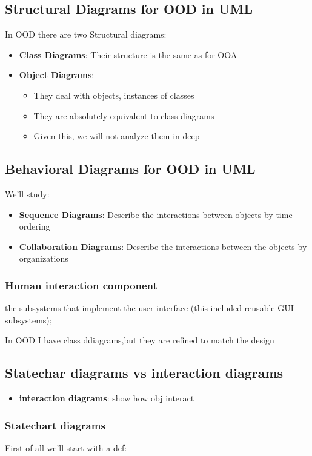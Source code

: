 \subsection{Structural Diagrams for OOD in UML}
In OOD there are two Structural diagrams:
\begin{itemize}
    \item \textbf{Class Diagrams}: Their structure is the same as for OOA
    \item \textbf{Object Diagrams}:
    \begin{itemize}
        \item They deal with objects, instances of classes
        \item  They are absolutely equivalent to class diagrams
        \item  Given this, we will not analyze them in deep
    \end{itemize} 
\end{itemize}

\subsection{Behavioral Diagrams for OOD in UML}
We'll study:
\begin{itemize}
    \item \textbf{Sequence Diagrams}: Describe the interactions between objects by time ordering
    \item \textbf{Collaboration Diagrams}: Describe the interactions between the objects by organizations
\end{itemize}


\subsubsection{Human interaction component}
the subsystems that implement the user interface (this included reusable GUI subsystems);

In OOD I have class ddiagrams,but they are refined to match the design

\subsection{Statechar diagrams vs interaction diagrams}
\begin{itemize}
    \item \textbf{interaction diagrams}: show how obj interact
\end{itemize}

\subsubsection{Statechart diagrams}
First of all we'll start with a def:

